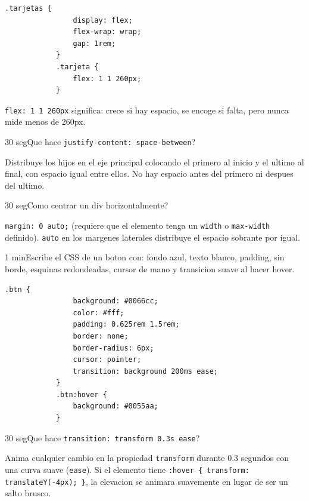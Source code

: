 \documentclass[11pt,a4paper]{article}
\newcounter{nej}
\newcommand{\ej}[2]{%
	\stepcounter{nej}%
	\begin{ejercicio}{\arabic{nej}}{#1}#2\end{ejercicio}\vspace{4pt}}
\begin{document}
	\begin{respuesta}
		\begin{lstlisting}[style=codecss]
			.tarjetas {
				display: flex;
				flex-wrap: wrap;
				gap: 1rem;
			}
			.tarjeta {
				flex: 1 1 260px;
			}
		\end{lstlisting}
		\texttt{flex: 1 1 260px} significa: crece si hay espacio, se encoge si falta, pero nunca mide menos de 260px.
	\end{respuesta}
	\vspace{6pt}
	
	\ej{30 seg}{Que hace \texttt{justify-content: space-between}?}
	
	\begin{respuesta}
		Distribuye los hijos en el eje principal colocando el primero al inicio y el ultimo al final, con espacio igual entre ellos. No hay espacio antes del primero ni despues del ultimo.
	\end{respuesta}
	\vspace{6pt}
	
	\ej{30 seg}{Como centrar un div horizontalmente?}
	
	\begin{respuesta}
		\texttt{margin: 0 auto;} (requiere que el elemento tenga un \texttt{width} o \texttt{max-width} definido). \texttt{auto} en los margenes laterales distribuye el espacio sobrante por igual.
	\end{respuesta}
	\vspace{6pt}
	
	\ej{1 min}{Escribe el CSS de un boton con: fondo azul, texto blanco, padding, sin borde, esquinas redondeadas, cursor de mano y transicion suave al hacer hover.}
	
	\begin{respuesta}
		\begin{lstlisting}[style=codecss]
			.btn {
				background: #0066cc;
				color: #fff;
				padding: 0.625rem 1.5rem;
				border: none;
				border-radius: 6px;
				cursor: pointer;
				transition: background 200ms ease;
			}
			.btn:hover {
				background: #0055aa;
			}
		\end{lstlisting}
	\end{respuesta}
	\vspace{6pt}
	
	\ej{30 seg}{Que hace \texttt{transition: transform 0.3s ease}?}
	
	\begin{respuesta}
		Anima cualquier cambio en la propiedad \texttt{transform} durante 0.3 segundos con una curva suave (\texttt{ease}). Si el elemento tiene \texttt{:hover \{ transform: translateY(-4px); \}}, la elevacion se animara suavemente en lugar de ser un salto brusco.
	\end{respuesta}
	\vspace{6pt}
	
\end{document}
